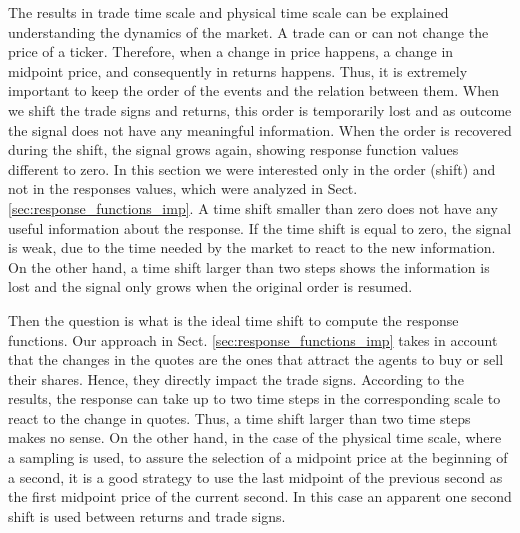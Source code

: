 The results in trade time scale and physical time scale can be explained
understanding the dynamics of the market. A trade can or can not change the
price of a ticker. Therefore, when a change in price happens, a change in
midpoint price, and consequently in returns happens. Thus, it is extremely
important to keep the order of the events and the relation between them. When
we shift the trade signs and returns, this order is temporarily lost and as
outcome the signal does not have any meaningful information. When the order is
recovered during the shift, the signal grows again, showing response function
values different to zero. In this section we were interested only in the order
(shift) and not in the responses values, which were analyzed in Sect.
\ref{sec:response_functions_imp}. A time shift smaller than zero does not have
any useful information about the response. If the time shift is equal to zero,
the signal is weak, due to the time needed by the market to react to the new
information. On the other hand, a time shift larger than two steps shows the
information is lost and the signal only grows when the original order is
resumed.

Then the question is what is the ideal time shift to compute the response
functions. Our approach in Sect. \ref{sec:response_functions_imp} takes in
account that the changes in the quotes are the ones that attract the agents to
buy or sell their shares. Hence, they directly impact the trade signs.
According to the results, the response can take up to two time steps in the
corresponding scale to react to the change in quotes. Thus, a time shift
larger than two time steps makes no sense.
On the other hand, in the case of the physical time scale, where a sampling is
used, to assure the selection of a midpoint price at the beginning of a second,
it is a good strategy to use the last midpoint of the previous second as the
first midpoint price of the current second. In this case an apparent one second
shift is used between returns and trade signs.